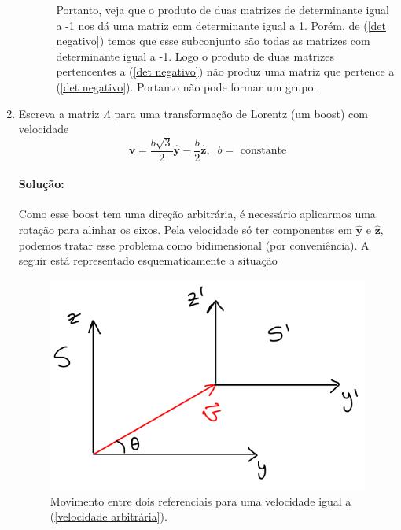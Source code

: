 \documentclass[10pt,a4paper]{article}
\begin{document}
\begin{enumerate}
\begin{enumerate}
\begin{enumerate}
	Portanto, veja que o produto de duas matrizes de determinante igual a -1 nos dá uma matriz com determinante igual a 1. Porém, de (\ref{det negativo}) temos que esse subconjunto são todas as matrizes com determinante igual a -1. Logo o produto de duas matrizes pertencentes a (\ref{det negativo}) não produz uma matriz que pertence a (\ref{det negativo}). Portanto não pode formar um grupo.
	\end{enumerate}
	\end{enumerate}
	
	\item Escreva a matriz $\Lambda$ para uma transformação de Lorentz (um boost) com velocidade 
	\begin{equation}\label{velocidade arbitrária}
	\mathbf{v} = \frac{b\sqrt{3}}{2}\mathbf{\hat{y}}-\frac{b}{2}\mathbf{\hat{z}}, \;\; b = \text{ constante}
	\end{equation}
	
	\paragraph{Solução:} Como esse boost tem uma direção arbitrária, é necessário aplicarmos uma rotação para alinhar os eixos. Pela velocidade só ter componentes em $\mathbf{\hat{y}}$ e $\mathbf{\hat{z}}$, podemos tratar esse problema como bidimensional (por conveniência). A seguir está representado esquematicamente a situação 
	
	\begin{figure}[H]
	\centering
	\includegraphics[scale=0.30]{figuras/boost.png}
	\caption{Movimento entre dois referenciais para uma velocidade igual a (\ref{velocidade arbitrária}).}
	\end{figure}
	

\end{enumerate}
\end{document}
